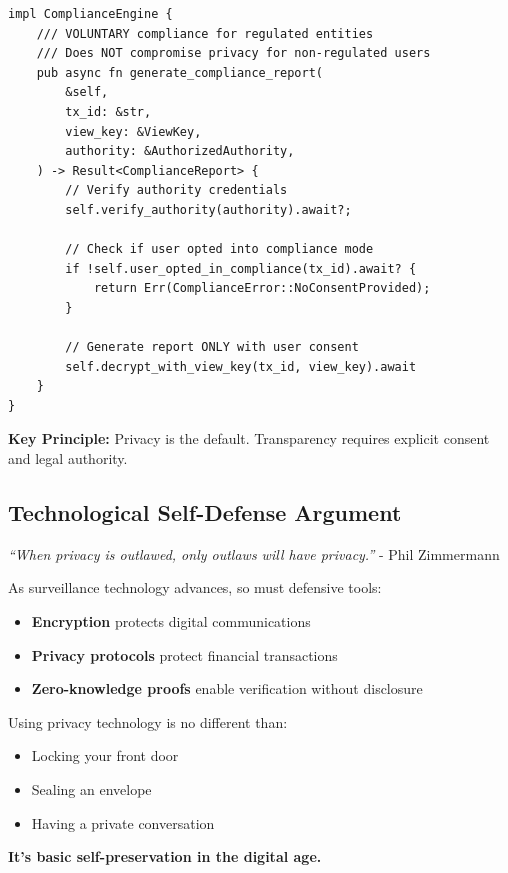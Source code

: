 \documentclass[12pt,a4paper]{article}
\begin{document}
\begin{lstlisting}[style=rustcode, caption=Compliance Through Choice, Not Surveillance]
impl ComplianceEngine {
    /// VOLUNTARY compliance for regulated entities
    /// Does NOT compromise privacy for non-regulated users
    pub async fn generate_compliance_report(
        &self,
        tx_id: &str,
        view_key: &ViewKey,
        authority: &AuthorizedAuthority,
    ) -> Result<ComplianceReport> {
        // Verify authority credentials
        self.verify_authority(authority).await?;

        // Check if user opted into compliance mode
        if !self.user_opted_in_compliance(tx_id).await? {
            return Err(ComplianceError::NoConsentProvided);
        }

        // Generate report ONLY with user consent
        self.decrypt_with_view_key(tx_id, view_key).await
    }
}
\end{lstlisting}

\textbf{Key Principle:} Privacy is the default. Transparency requires explicit consent and legal authority.

\subsection{Technological Self-Defense Argument}

\textit{``When privacy is outlawed, only outlaws will have privacy.''} - Phil Zimmermann

As surveillance technology advances, so must defensive tools:

\begin{itemize}
\item \textbf{Encryption} protects digital communications
\item \textbf{Privacy protocols} protect financial transactions
\item \textbf{Zero-knowledge proofs} enable verification without disclosure
\end{itemize}

Using privacy technology is no different than:
\begin{itemize}
\item Locking your front door
\item Sealing an envelope
\item Having a private conversation
\end{itemize}

\textbf{It's basic self-preservation in the digital age.}
\end{document}
